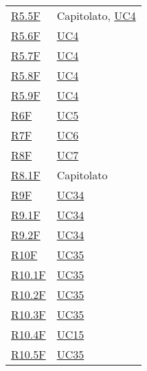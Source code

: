 \begin{center}
\begin{longtable}[!h]{p{50px} p{50px}}
        \hyperref[tab:RequisitiFunzionali]{R5.5F}  & Capitolato, \newline \hyperref[sec:UC4]{UC4}   \\
        \hyperref[tab:RequisitiFunzionali]{R5.6F}  & \hyperref[sec:UC4]{UC4}                        \\
        \hyperref[tab:RequisitiFunzionali]{R5.7F}  & \hyperref[sec:UC4]{UC4}                        \\
        \hyperref[tab:RequisitiFunzionali]{R5.8F}  & \hyperref[sec:UC4]{UC4}                        \\
        \hyperref[tab:RequisitiFunzionali]{R5.9F}  & \hyperref[sec:UC4]{UC4}                        \\
        \hyperref[tab:RequisitiFunzionali]{R6F}    & \hyperref[sec:UC5]{UC5}                        \\
        \hyperref[tab:RequisitiFunzionali]{R7F}    & \hyperref[sec:UC6]{UC6}                        \\
        \hyperref[tab:RequisitiFunzionali]{R8F}    & \hyperref[sec:UC7]{UC7}                        \\
        \hyperref[tab:RequisitiFunzionali]{R8.1F}  & Capitolato                                     \\
        \hyperref[tab:RequisitiFunzionali]{R9F}    & \hyperref[sec:UC34]{UC34}                      \\
        \hyperref[tab:RequisitiFunzionali]{R9.1F}  & \hyperref[sec:UC34]{UC34}                      \\
        \hyperref[tab:RequisitiFunzionali]{R9.2F}  & \hyperref[sec:UC34]{UC34}                      \\
        \hyperref[tab:RequisitiFunzionali]{R10F}   & \hyperref[sec:UC35]{UC35}                      \\
        \hyperref[tab:RequisitiFunzionali]{R10.1F} & \hyperref[sec:UC35]{UC35}                      \\
        \hyperref[tab:RequisitiFunzionali]{R10.2F} & \hyperref[sec:UC35]{UC35}                      \\
        \hyperref[tab:RequisitiFunzionali]{R10.3F} & \hyperref[sec:UC35]{UC35}                      \\
        \hyperref[tab:RequisitiFunzionali]{R10.4F} & \hyperref[sec:UC15]{UC15}                      \\
        \hyperref[tab:RequisitiFunzionali]{R10.5F} & \hyperref[sec:UC35]{UC35}                      \\

\end{longtable}
\end{center}
